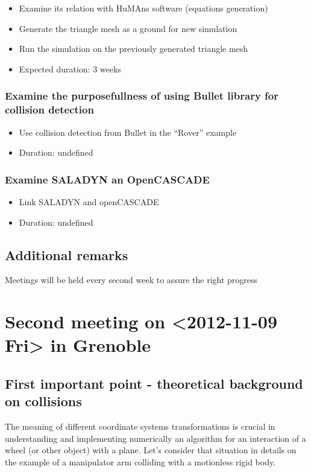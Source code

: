 \documentclass[11pt]{article}
\begin{document}
\begin{itemize}
\item Examine its relation with HuMAns software (equations generation)
\item Generate the triangle mesh as a ground for new simulation
\item Run the simulation on the previously generated triangle mesh
\item Expected duration: 3 weeks
\end{itemize}
\subsubsection{Examine the purposefullness of using Bullet library for collision detection}
\label{sec-1.2.3}


\begin{itemize}
\item Use collision detection from Bullet in the ``Rover'' example
\item Duration: undefined
\end{itemize}
\subsubsection{Examine SALADYN an OpenCASCADE}
\label{sec-1.2.4}


\begin{itemize}
\item Link SALADYN and openCASCADE
\item Duration: undefined
\end{itemize}
\subsection{Additional remarks}
\label{sec-1.3}


   Meetings will be held every second week to assure the right progress
      

\section{Second meeting on <2012-11-09 Fri> in Grenoble}
\label{sec-2}


\subsection{First important point - theoretical background on collisions}
\label{sec-2.1}


   The meaning of different coordinate systems transformations is crucial in understanding
   and implementing numerically an algorithm for an interaction of a wheel (or other object)
   with a plane. Let's consider that situation in details on the example of a manipulator arm
   colliding with a motionless rigid body.
\end{document}
